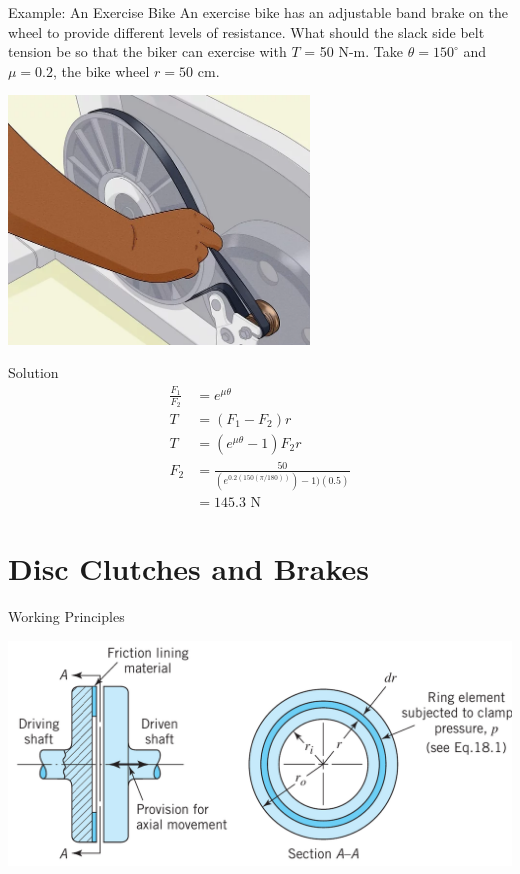 \documentclass[10pt, svgnames]{beamer}
\begin{document}
\begin{frame}[label={sec:org137c25c}]{Example: An Exercise Bike}
An exercise bike has an adjustable band brake on the wheel to provide different levels of resistance. What should the slack side belt tension be so that the biker can exercise with \(T\) = 50 N-m. Take \(\theta = 150^{\circ}\) and \(\mu = 0.2\), the bike wheel \(r = 50\) cm.

\begin{center}
\includegraphics[width=0.6\textwidth]{./pictures/exercise-bike-brake.png}
\end{center}
\end{frame}

\begin{frame}[label={sec:orgc2f89ff}]{Solution}
\begin{align*}
    \frac{F_1}{F_2} &= e^{\mu\theta} \\
    T &= (F_1 - F_2)r \\
    T &= (e^{\mu \theta} - 1) F_2 r \\
    F_2 &= \frac{50}{(e^{0.2(150(\pi/180))}) - 1)(0.5)} \\
        &= 145.3 \text{ N}
\end{align*}
\end{frame}

\section{Disc Clutches and Brakes}
\label{sec:orgf92b37e}

\begin{frame}[label={sec:orga30c674}]{Working Principles}
\begin{center}
\includegraphics[width=\textwidth]{./pictures/disc-brake-components.png}
\end{center}
\end{frame}
\end{document}
